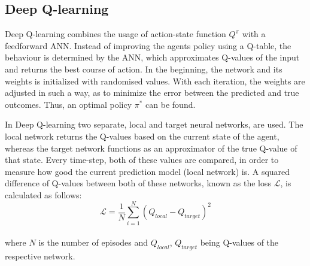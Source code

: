 \documentclass{article}
\begin{document}
\newpage
\subsection{Deep Q-learning}
Deep Q-learning combines the usage of action-state function $Q^\pi$ with a feedforward ANN. Instead of improving the agents policy using a Q-table, the behaviour is determined by the ANN, which approximates Q-values of the input and returns the best course of action. In the beginning, the network and its weights is initialized with randomised values. With each iteration, the weights are adjusted in such a way, as to minimize the error between the predicted and true outcomes. Thus, an optimal policy $\pi^*$ can be found.

In Deep Q-learning two separate, local and target neural networks, are used. The local network returns the Q-values based on the current state of the agent, whereas the target network functions as an approximator of the true Q-value of that state. Every time-step, both of these values are compared, in order to measure how good the current prediction model (local network) is. A squared difference of Q-values between both of these networks, known as the loss $\mathcal{L}$, is calculated as follows:
\begin{equation}
    \mathcal{L} = \frac{1}{N}\sum^{N}_{i=1}{(Q_{local}-Q_{target})^2}
\end{equation}
\\
where $N$ is the number of episodes and $Q_{local}$, $Q_{target}$ being Q-values of the respective network.
\end{document}
